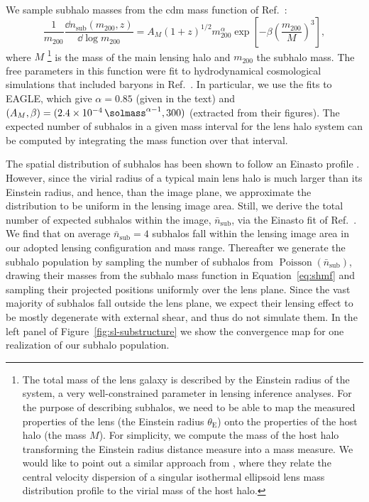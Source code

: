 We sample subhalo masses from the \gls*{cdm} mass function of Ref.~\cite{Giocoli:2009ie}:
\begin{equation} \label{eq:shmf}
    \frac{1}{m_\mathrm{200}}\frac{\dd n_\mathrm{sub}( m_\mathrm{200}, z)}{\dd\log m_\mathrm{200}} = A_M (1+z)^{1/2}m_{200}^{\alpha} \exp\left[-\beta\left(\frac{m_\mathrm{200}}{M}\right)^3 \right],
\end{equation}
where $M$ \footnote{
    The total mass of the lens galaxy is described by the Einstein radius of the system, a very well-constrained parameter in lensing inference analyses. For the purpose of describing subhalos, we need to be able to map the measured properties of the lens (the Einstein radius $\theta_\mathrm{E}$) onto the properties of the host halo (the mass $M$). For simplicity, we compute the mass of the host halo transforming the Einstein radius distance measure into a mass measure. We would like to point out a similar approach from \cite{Brehmer:2019jyt}, where they relate the central velocity dispersion of a singular isothermal ellipsoid lens mass distribution profile to the virial mass of the host halo.
}  is the mass of the main lensing halo and $m_\mathrm{200}$ the subhalo mass. The free parameters in this function were fit to hydrodynamical cosmological simulations that included baryons in Ref.~\cite{Despali:2016meh}. In particular, we use the fits to EAGLE, which give $\alpha = 0.85$ (given in the text) and $(A_M, \beta) = (2.4\times10^{-4}\, \si{\solmass}^{\alpha - 1}, 300)$ (extracted from their figures). The expected number of subhalos in a given mass interval for the lens halo system can be computed by integrating the mass function over that interval.

The spatial distribution of subhalos has been shown to follow an Einasto profile \cite{Springel:2008cc}. However, since the virial radius of a typical main lens halo is much larger than its Einstein radius, and hence, than the image plane, we approximate the distribution to be uniform in the lensing image area. Still, we derive the total number of expected subhalos within the image,  $\bar{n}_\mathrm{sub}$,  via the Einasto fit of Ref.~\cite{Despali:2016meh}. We find that on average $\bar{n}_\mathrm{sub}=4$ subhalos fall within the lensing image area in our adopted lensing configuration and mass range. %
Thereafter we generate the subhalo population by sampling the number of subhalos from $\operatorname{Poisson}(\bar{n}_\mathrm{sub})$, drawing their masses from the subhalo mass function in Equation~\eqref{eq:shmf} and sampling their projected positions uniformly over the lens plane. Since the vast majority of subhalos fall outside the lens plane, we expect their lensing effect to be mostly degenerate with external shear, and thus do not simulate them. In the left panel of Figure~\ref{fig:sl-substructure} we show the convergence map for one realization of our subhalo population.

